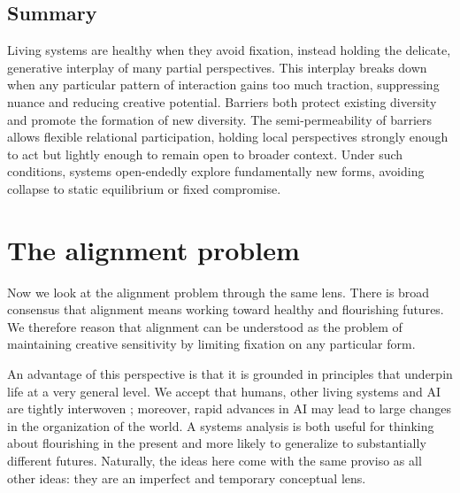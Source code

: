 \documentclass[11pt]{article}
\begin{document}


\subsection*{Summary}

Living systems are healthy when they avoid fixation, instead holding the delicate, generative interplay of many partial perspectives. This interplay breaks down when any particular pattern of interaction gains too much traction, suppressing nuance and reducing creative potential. Barriers both protect existing diversity and promote the formation of new diversity. The semi-permeability of barriers allows flexible relational participation, holding local perspectives strongly enough to act but lightly enough to remain open to broader context. Under such conditions, systems open-endedly explore fundamentally new forms, avoiding collapse to static equilibrium or fixed compromise.

\section{The alignment problem}

Now we look at the alignment problem through the same lens. There is broad consensus that alignment means working toward healthy and flourishing futures. We therefore reason that alignment can be understood as the problem of maintaining creative sensitivity by limiting fixation on any particular form. 


An advantage of this perspective is that it is grounded in principles that underpin life at a very general level. We accept that humans, other living systems and AI are tightly interwoven \citep{latour2012we, haraway2020staying, hayles2000we, bateson1972steps, folke2006resilience, douglas2012social}; moreover, rapid advances in AI may lead to large changes in the organization of the world. A systems analysis is both useful for thinking about flourishing in the present and more likely to generalize to substantially different futures. Naturally, the ideas here come with the same proviso as all other ideas: they are an imperfect and temporary conceptual lens.
\end{document}
